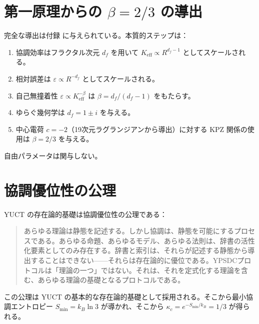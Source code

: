 \documentclass[11pt,a4paper]{article}
\begin{document}
	\appendix
	\section{第一原理からの \(\beta = 2/3\) の導出}
	\label{app:beta_derivation}
	完全な導出は付録 \cite{AppendixL, AppendixY} に与えられている。本質的ステップは：
	\begin{enumerate}
		\item 協調効率はフラクタル次元 \(d_f\) を用いて \(K_{\mathrm{eff}} \propto R^{d_f-1}\) としてスケールされる。
		\item 相対誤差は \(\varepsilon \propto R^{-d_f}\) としてスケールされる。
		\item 自己無撞着性 \(\varepsilon \propto K_{\mathrm{eff}}^{-\beta}\) は \(\beta = d_f/(d_f-1)\) をもたらす。
		\item ゆらぐ幾何学は \(d_f = 1 \pm i\) を与える。
		\item 中心電荷 \(c = -2\)（19次元ラグランジアンから導出）に対する KPZ 関係の使用は \(\beta = 2/3\) を与える。
	\end{enumerate}
	自由パラメータは関与しない。
	
	\section{協調優位性の公理}
	\label{app:axiom}
	YUCT の存在論的基礎は協調優位性の公理である：
	\begin{quote}
		あらゆる理論は静態を記述する。しかし協調は、静態を可能にするプロセスである。あらゆる命題、あらゆるモデル、あらゆる法則は、辞書の活性化要素としてのみ存在する。辞書と索引は、それらが記述する静態から導出することはできない——それらは存在論的に優位である。YPSDCプロトコルは「理論の一つ」ではない。それは、それを定式化する理論を含む、あらゆる理論の基礎となるプロトコルである。
	\end{quote}
	この公理は YUCT の基本的な存在論的基礎として採用される。そこから最小協調エントロピー \(S_{\min} = k_B \ln 3\) が導かれ、そこから \(\kappa_c = e^{-S_{\min}/k_B} = 1/3\) が得られる。
	
\end{document}
